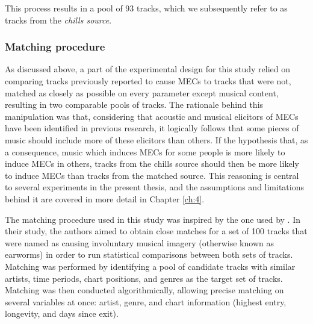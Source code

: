This process results in a pool of 93 tracks, which we subsequently refer to as tracks from the \emph{chills source}.

\subsubsection{Matching procedure}

As discussed above, a part of the experimental design for this study relied on comparing tracks previously reported to cause MECs to tracks that were not, matched as closely as possible on every parameter except musical content, resulting in two comparable pools of tracks. The rationale behind this manipulation was that, considering that acoustic and musical elicitors of MECs have been identified in previous research, it logically follows that some pieces of music should include more of these elicitors than others. If the hypothesis that, as a consequence, music which induces MECs for some people is more likely to induce MECs in others, tracks from the chills source should then be more likely to induce MECs than tracks from the matched source. This reasoning is central to several experiments in the present thesis, and the assumptions and limitations behind it are covered in more detail in Chapter \ref{ch:4}.

The matching procedure used in this study was inspired by the one used by \textcite{jakubowski2017}. In their study, the authors aimed to obtain close matches for a set of 100 tracks that were named as causing involuntary musical imagery (otherwise known as earworms) in order to run statistical comparisons between both sets of tracks. Matching was performed by identifying a pool of candidate tracks with similar artists, time periods, chart positions, and genres as the target set of tracks. Matching was then conducted algorithmically, allowing precise matching on several variables at once: artist, genre, and chart information (highest entry, longevity, and days since exit).

